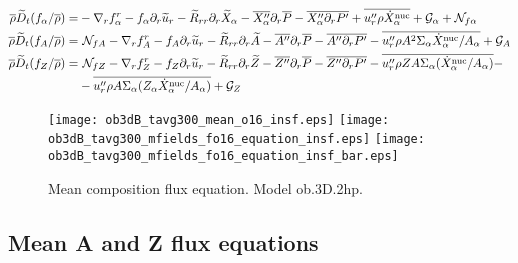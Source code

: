 \documentclass[10pt,paper=a4]{report}
\newcommand{\eht}{\overline}
\newcommand{\fht}{\widetilde}
\newcommand{\fav}{\widetilde}
\def\erho{\eht{\rho}}
\begin{document}
\begin{align}
\erho \fav{D}_t (f_\alpha / \eht{\rho}) = &  -\nabla_r f_\alpha^r  - f_\alpha \partial_r \fht{u}_r - \fht{R}_{rr} \partial_r \fht{X}_\alpha -\eht{X''_\alpha} \partial_r \eht{P} - \eht{X''_\alpha \partial_r P'} + \overline{u''_r \rho \dot{X}_\alpha^{\rm nuc}} + {\mathcal G_\alpha} + {\mathcal N_{f\alpha}} \label{eq:rans_falpha} \\
\erho \fav{D}_t (f_A / \eht{\rho}) = &  \ {\mathcal N_{fA}} -\nabla_r f_A^r - f_A \partial_r \fht{u}_r - \fht{R}_{rr} \partial_r \fht{A} -\eht{A''} \partial_r \eht{P} - \eht{A'' \partial_r P'} - \overline{u''_r \rho A^2\Sigma_\alpha \dot{X}_\alpha^{\rm nuc} / A_\alpha} + {\mathcal G_A}                 \label{eq:rans_fabar} \\
\erho \fav{D}_t (f_Z / \eht{\rho}) = &  \ {\mathcal N_{fZ}} -\nabla_r f_Z^r  - f_Z \partial_r \fht{u}_r - \fht{R}_{rr} \partial_r \fht{Z} -\eht{Z''} \partial_r \eht{P} - \eht{Z'' \partial_r P'} - \overline{u''_r \rho Z A \Sigma_\alpha (\dot{X}_\alpha^{\rm nuc}/ A_\alpha)} - \nonumber \\ 
& - \overline{u''_r \rho A \Sigma_\alpha (Z_\alpha \dot{X}_\alpha^{\rm nuc} / A_\alpha)}  + {\mathcal G_Z}   \label{eq:rans_fzbar} 
\end{align}

\vspace{1.cm}

\begin{figure}[!h]
\centerline{
\texttt{[image: ob3dB\_tavg300\_mean\_o16\_insf.eps]}
\texttt{[image: ob3dB\_tavg300\_mfields\_fo16\_equation\_insf.eps]}
\texttt{[image: ob3dB\_tavg300\_mfields\_fo16\_equation\_insf\_bar.eps]}}
\caption{Mean composition flux equation. Model {\sf ob.3D.2hp}.\label{fig:fcomp-equation}}
\end{figure}

\newpage

\subsection{Mean A and Z flux equations}

\vspace{1.cm}
\end{document}
